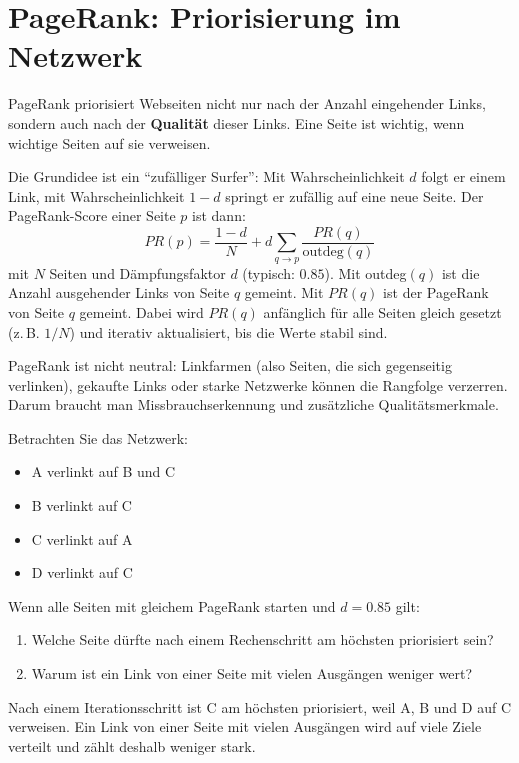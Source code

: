 \chapter{PageRank: Priorisierung im Netzwerk}
\label{chap:pagerank}

\begin{mydefinition}[PageRank]
    PageRank priorisiert Webseiten nicht nur nach der Anzahl eingehender Links,
    sondern auch nach der \textbf{Qualität} dieser Links.
    Eine Seite ist wichtig, wenn wichtige Seiten auf sie verweisen.
\end{mydefinition}

Die Grundidee ist ein \enquote{zufälliger Surfer}:
Mit Wahrscheinlichkeit $d$ folgt er einem Link, mit Wahrscheinlichkeit $1-d$ springt er zufällig auf eine neue Seite.
Der PageRank-Score einer Seite $p$ ist dann:
\[
    PR(p) = \frac{1-d}{N} + d \sum_{q \to p} \frac{PR(q)}{\text{outdeg}(q)}
\]
mit $N$ Seiten und Dämpfungsfaktor $d$ (typisch: $0.85$). Mit outdeg$(q)$ ist die Anzahl ausgehender Links von Seite $q$ gemeint. Mit $PR(q)$ ist der PageRank von Seite $q$ gemeint. Dabei wird $PR(q)$ anfänglich für alle Seiten gleich gesetzt (z.\,B. $1/N$) und iterativ aktualisiert, bis die Werte stabil sind.

\begin{mycaution}
    PageRank ist nicht neutral: Linkfarmen (also Seiten, die sich gegenseitig verlinken), gekaufte Links oder starke Netzwerke können die Rangfolge verzerren.
    Darum braucht man Missbrauchserkennung und zusätzliche Qualitätsmerkmale.
\end{mycaution}

\begin{myexercise}
    Betrachten Sie das Netzwerk:
    \begin{itemize}
        \item A verlinkt auf B und C
        \item B verlinkt auf C
        \item C verlinkt auf A
        \item D verlinkt auf C
    \end{itemize}
    Wenn alle Seiten mit gleichem PageRank starten und $d=0.85$ gilt:
    \begin{enumerate}
        \item Welche Seite dürfte nach einem Rechenschritt am höchsten priorisiert sein?
        \item Warum ist ein Link von einer Seite mit vielen Ausgängen weniger wert?
    \end{enumerate}
    \begin{myanswer}
        Nach einem Iterationsschritt ist C am höchsten priorisiert, weil A, B und D auf C verweisen.
        Ein Link von einer Seite mit vielen Ausgängen wird auf viele Ziele verteilt und zählt deshalb weniger stark.
    \end{myanswer}
\end{myexercise}

